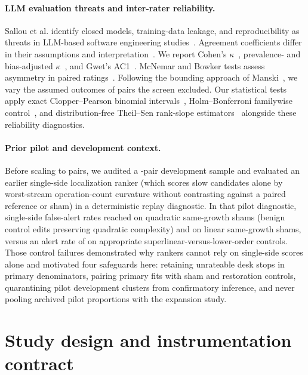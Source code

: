 \documentclass[11pt]{article}
\begin{document}
\paragraph{LLM evaluation threats and inter-rater reliability.}
Sallou et al. identify closed models, training-data leakage, and reproducibility as threats in LLM-based software engineering studies~\cite{sallou2024breaking}.
Agreement coefficients differ in their assumptions and interpretation~\cite{artstein2008inter,krippendorff2004reliability}. We report Cohen's $\kappa$~\cite{cohen1960coefficient}, prevalence- and bias-adjusted $\kappa$~\cite{byrt1993bias}, and Gwet's AC1~\cite{gwet2008computing}. McNemar and Bowker tests assess asymmetry in paired ratings~\cite{mcnemar1947note,bowker1948test}. Following the bounding approach of Manski~\cite{manski1990nonparametric}, we vary the assumed outcomes of pairs the screen excluded.
Our statistical tests apply exact Clopper--Pearson binomial intervals~\cite{clopper1934use}, Holm--Bonferroni familywise control~\cite{holm1979simple}, and distribution-free Theil--Sen rank-slope estimators~\cite{theil1950rank,sen1968estimates} alongside these reliability diagnostics.

\paragraph{Prior pilot and development context.}
Before scaling to \BenchPairs{} pairs, we audited a \BenchPilotPairs{}-pair development sample and evaluated an earlier single-side localization ranker (which scores slow candidates alone by worst-stream operation-count curvature without contrasting against a paired reference or sham) in a deterministic replay diagnostic.
In that pilot diagnostic, single-side false-alert rates reached \GroupedQuadraticFalse{} on quadratic same-growth shams (benign control edits preserving quadratic complexity) and \GroupedLinearFalse{} on linear same-growth shams, versus an alert rate of \GroupedAppropriateFalse{} on appropriate superlinear-versus-lower-order controls.
Those control failures demonstrated why rankers cannot rely on single-side scores alone and motivated four safeguards here: retaining unrateable desk stops in primary denominators, pairing primary fits with sham and restoration controls, quarantining pilot development clusters from confirmatory inference, and never pooling archived pilot proportions with the expansion study.

\section{Study design and instrumentation contract}
\label{sec:design}
\end{document}
